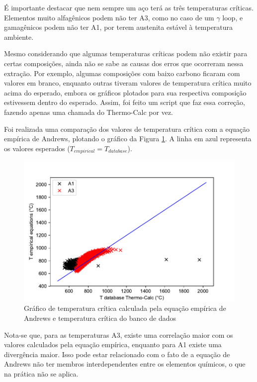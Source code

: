 \documentclass[brazil,tf,epusp]{usp}  %
\begin{document}
É importante destacar que nem sempre um aço terá as três temperaturas críticas. Elementos muito alfagênicos podem não ter A3, como no caso de um $\gamma$ loop, e gamagênicos podem não ter A1, por terem austenita estável à temperatura ambiente.

Mesmo considerando que algumas temperaturas críticas podem não existir para certas composições, ainda não se sabe as causas dos erros que ocorreram nessa extração. Por exemplo, algumas composições com baixo carbono ficaram com valores em branco, enquanto outras tiveram valores de temperatura crítica muito acima do esperado, embora os gráficos plotados para sua respectiva composição estivessem dentro do esperado. Assim, foi feito um script que faz essa correção, fazendo apenas uma chamada do Thermo-Calc\textregistered{} por vez.


Foi realizada uma comparação dos valores de temperatura crítica com a equação empírica de Andrews, plotando o gráfico da Figura \ref{fig:tcrit_andrews}. A linha em azul representa os valores esperados ($T_{empirical} = T_{database}$).

\begin{figure}
  \includegraphics[width=1.1\textwidth]{img/andrews.pdf}
  \caption{Gráfico de temperatura crítica calculada pela equação empírica de Andrews e temperatura crítica do banco de dados}
  \label{fig:tcrit_andrews}
\end{figure}

Nota-se que, para as temperaturas A3, existe uma correlação maior com os valores calculados pela equação empírica, enquanto para A1 existe uma divergência maior. Isso pode estar relacionado com o fato de a equação de Andrews não ter membros interdependentes entre os elementos químicos, o que na prática não se aplica.
\end{document}
